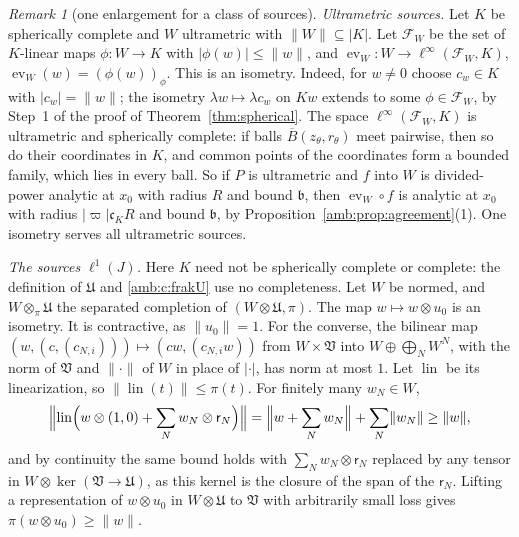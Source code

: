 \documentclass[11pt]{amsart}
\theoremstyle{definition}
\theoremstyle{remark}
\newtheorem{remark}[theorem]{Remark}
\numberwithin{equation}{section}
\newcommand{\abs}[1]{\lvert #1\rvert}
\newcommand{\norm}[1]{\lVert #1\rVert}
\theoremstyle{plain}
\theoremstyle{definition}
\theoremstyle{plain}
\newcommand{\hot}{\mathbin{\widehat\otimes}}
\begin{document}
\begin{remark}[one enlargement for a class of sources]\label{amb:rem:one-space}
\emph{Ultrametric sources.} Let $K$ be spherically complete and $W$ ultrametric with $\norm W\subseteq\abs K$. Let $\mathcal F_W$ be the set of $K$-linear maps $\phi\colon W\to K$ with $\abs{\phi(w)}\le\norm w$, and $\operatorname{ev}_W\colon W\to\ell^\infty(\mathcal F_W,K)$, $\operatorname{ev}_W(w)=(\phi(w))_\phi$. This is an isometry. Indeed, for $w\ne0$ choose $c_w\in K$ with $\abs{c_w}=\norm w$; the isometry $\lambda w\mapsto\lambda c_w$ on $Kw$ extends to some $\phi\in\mathcal F_W$, by Step~1 of the proof of Theorem~\ref{thm:spherical}. The space $\ell^\infty(\mathcal F_W,K)$ is ultrametric and spherically complete: if balls $\overline B(z_\theta,r_\theta)$ meet pairwise, then so do their coordinates in $K$, and common points of the coordinates form a bounded family, which lies in every ball. So if $P$ is ultrametric and $f$ into $W$ is divided-power analytic at $x_0$ with radius $R$ and bound $\mathfrak b$, then $\operatorname{ev}_W\circ f$ is analytic at $x_0$ with radius $\abs\varpi\mathfrak c_KR$ and bound $\mathfrak b$, by Proposition~\ref{amb:prop:agreement}(1). One isometry serves all ultrametric sources.

\emph{The sources $\ell^1(J)$.} Here $K$ need not be spherically complete or complete: the definition of $\mathfrak U$ and \eqref{amb:c:frakU} use no completeness. Let $W$ be normed, and $W\hot_\pi\mathfrak U$ the separated completion of $(W\otimes\mathfrak U,\pi)$. The map $w\mapsto w\otimes u_0$ is an isometry. It is contractive, as $\norm{u_0}=1$. For the converse, the bilinear map $(w,(c,(c_{N,i})))\mapsto(cw,(c_{N,i}w))$ from $W\times\mathfrak V$ into $W\oplus\bigoplus_NW^N$, with the norm of $\mathfrak V$ and $\norm\cdot$ of $W$ in place of $\abs\cdot$, has norm at most $1$. Let $\operatorname{lin}$ be its linearization, so $\norm{\operatorname{lin}(t)}\le\pi(t)$. For finitely many $w_N\in W$,
\[
 \Bigl\lVert\operatorname{lin}\Bigl(w\otimes(1,0)+\sum_Nw_N\otimes\mathsf r_N\Bigr)\Bigr\rVert=\Bigl\lVert w+\sum_Nw_N\Bigr\rVert+\sum_N\norm{w_N}\ge\norm w,
\]
and by continuity the same bound holds with $\sum_Nw_N\otimes\mathsf r_N$ replaced by any tensor in $W\otimes\ker(\mathfrak V\to\mathfrak U)$, as this kernel is the closure of the span of the $\mathsf r_N$. Lifting a representation of $w\otimes u_0$ in $W\otimes\mathfrak U$ to $\mathfrak V$ with arbitrarily small loss gives $\pi(w\otimes u_0)\ge\norm w$.


\end{remark}
\end{document}
